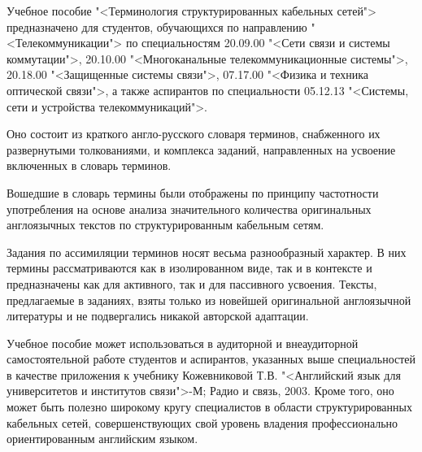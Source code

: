 \setlength\parindent{1.25cm}

Учебное пособие "<Терминология структурированных кабельных сетей"> предназначено для
студентов, обучающихся по направлению "<Телекоммуникации"> по специальностям 20.09.00
"<Сети связи и системы коммутации">, 20.10.00 "<Многоканальные телекоммуникационные
системы">, 20.18.00 "<Защищенные системы связи">, 07.17.00 "<Физика и техника оптической
связи">, а также аспирантов по специальности 05.12.13 "<Системы, сети и устройства телекоммуникаций">.\par
Оно состоит из краткого англо-русского словаря терминов, снабженного их развернутыми 
толкованиями, и комплекса заданий, направленных на усвоение включенных в словарь терминов.\par
Вошедшие в словарь термины были отображены по принципу частотности употребления на основе анализа значительного
количества оригинальных англоязычных текстов по структурированным кабельным сетям.\par
Задания по ассимиляции терминов носят весьма разнообразный характер. В них термины
рассматриваются как в изолированном виде, так и в контексте и предназначены как для активного, так и для
пассивного усвоения. Тексты, предлагаемые в заданиях, взяты только из новейшей оригинальной англоязычной
литературы и не подвергались никакой авторской адаптации.\par
Учебное пособие может использоваться в аудиторной и внеаудиторной самостоятельной
работе студентов и аспирантов, указанных выше специальностей в качестве приложения к
учебнику Кожевниковой Т.В. "<Английский язык для университетов и институтов связи">-М;
Радио и связь, 2003. Кроме того, оно может быть полезно широкому кругу специалистов в 
области структурированных кабельных сетей, совершенствующих свой уровень владения
профессионально ориентированным английским языком.
